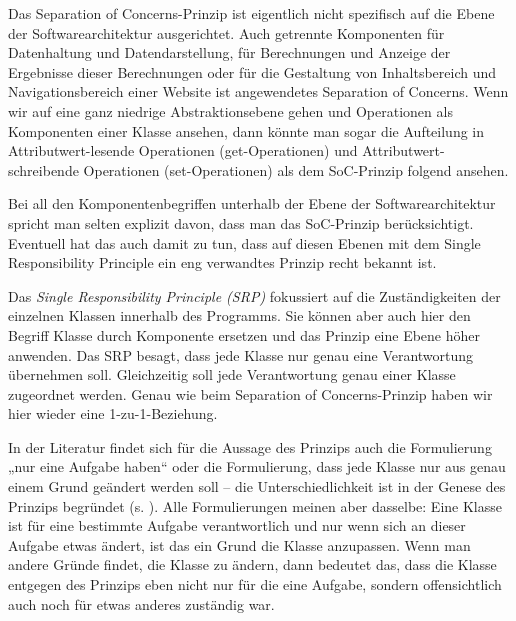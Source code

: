 Das Separation of Concerns-Prinzip ist eigentlich nicht spezifisch auf die Ebene der Softwarearchitektur ausgerichtet. Auch getrennte Komponenten für Datenhaltung und Datendarstellung, für Berechnungen und Anzeige der Ergebnisse dieser Berechnungen oder für die Gestaltung von Inhaltsbereich und Navigationsbereich einer Website ist angewendetes Separation of Concerns. Wenn wir auf eine ganz niedrige Abstraktionsebene gehen und Operationen als Komponenten einer Klasse ansehen, dann könnte man sogar die Aufteilung in Attributwert-lesende Operationen (get-Operationen) und Attributwert-schreibende Operationen (set-Operationen) als dem SoC-Prinzip folgend ansehen. 

\vspace{1.8mm} %

Bei all den Komponentenbegriffen unterhalb der Ebene der Softwarearchitektur spricht man selten explizit davon, dass man das SoC-Prinzip berücksichtigt. \mbox{Eventuell} hat das auch damit zu tun, dass auf diesen Ebenen mit dem Single Responsibility Principle ein eng verwandtes Prinzip recht bekannt ist.

\vspace{1.8mm} %

Das \textit{Single Responsibility Principle (SRP)}
fokussiert auf die Zuständigkeiten der einzelnen Klassen innerhalb des Programms. Sie können aber auch hier den Begriff Klasse durch Komponente ersetzen und das Prinzip eine Ebene höher anwenden. Das SRP besagt, dass jede Klasse nur genau eine Verantwortung übernehmen soll. Gleichzeitig soll jede Verantwortung genau einer Klasse zugeordnet werden. Genau wie beim Separation of Concerns-Prinzip haben wir hier wieder eine 1-zu-1-Beziehung.
 
\vspace{1.8mm} %

In der Literatur findet sich für die Aussage des Prinzips auch die Formulierung „nur eine Aufgabe haben“ oder die Formulierung, dass jede Klasse nur aus genau einem Grund geändert werden soll – die Unterschiedlichkeit ist in der Genese des Prinzips begründet (s. \cite[406]{bro21}). Alle Formulierungen meinen aber dasselbe: Eine Klasse ist für eine bestimmte Aufgabe verantwortlich und nur wenn sich an dieser Aufgabe etwas ändert, ist das ein Grund die Klasse anzupassen. Wenn man andere Gründe findet, die Klasse zu ändern, dann bedeutet das, dass die Klasse entgegen des Prinzips eben nicht nur für die eine Aufgabe, sondern offensichtlich auch noch für etwas anderes zuständig war. 

